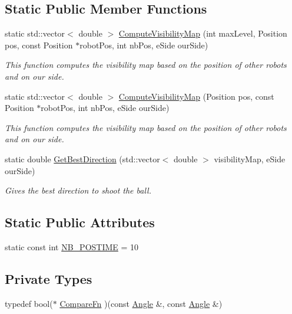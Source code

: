 \subsection*{Static Public Member Functions}
\begin{DoxyCompactItemize}
\item 
static std::vector$<$ double $>$ \hyperlink{classBallMonitor_a0d2ef73ba2b0573021c800c311e08245}{ComputeVisibilityMap} (int maxLevel, Position pos, const Position $\ast$robotPos, int nbPos, eSide ourSide)
\begin{DoxyCompactList}\small\item\em This function computes the visibility map based on the position of other robots and on our side. \item\end{DoxyCompactList}\item 
static std::vector$<$ double $>$ \hyperlink{classBallMonitor_a53e07299cf403dd036cab543d37fbf92}{ComputeVisibilityMap} (Position pos, const Position $\ast$robotPos, int nbPos, eSide ourSide)
\begin{DoxyCompactList}\small\item\em This function computes the visibility map based on the position of other robots and on our side. \item\end{DoxyCompactList}\item 
static double \hyperlink{classBallMonitor_a9045d5d3abf9c9b549303c831b3387e0}{GetBestDirection} (std::vector$<$ double $>$ visibilityMap, eSide ourSide)
\begin{DoxyCompactList}\small\item\em Gives the best direction to shoot the ball. \item\end{DoxyCompactList}\end{DoxyCompactItemize}
\subsection*{Static Public Attributes}
\begin{DoxyCompactItemize}
\item 
static const int \hyperlink{classBallMonitor_a6603291a8d6c6a2de7b378ece54d5e2b}{NB\_\-POSTIME} = 10
\end{DoxyCompactItemize}
\subsection*{Private Types}
\begin{DoxyCompactItemize}
\item 
typedef bool($\ast$ \hyperlink{classBallMonitor_a5ad781c99d5b43bee7c838de9da75527}{CompareFn} )(const \hyperlink{structBallMonitor_1_1Angle}{Angle} \&, const \hyperlink{structBallMonitor_1_1Angle}{Angle} \&)
\end{DoxyCompactItemize}
